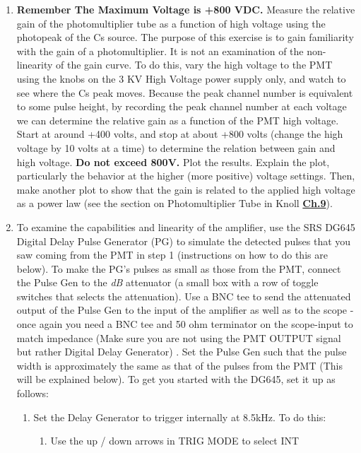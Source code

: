 \documentclass{../lab}
\begin{document}
\begin{enumerate}
    \item \textbf{Remember The Maximum Voltage is +800 VDC.} Measure the relative gain of the photomultiplier tube as a function of high voltage using the photopeak of the Cs source. The purpose of this exercise is to gain familiarity with the gain of a photomultiplier. It is not an examination of the non-linearity of the gain curve. To do this, vary the high voltage to the PMT using the knobs on the 3 KV High Voltage power supply only, and watch to see where the Cs peak moves. Because the peak channel number is equivalent to some pulse height, by recording the peak channel number at each voltage we can determine the relative gain as a function of the PMT high voltage. Start at around +400 volts, and stop at about +800 volts (change the high voltage by 10 volts at a time) to determine the relation between gain and high voltage. \textbf{Do not exceed 800V.} Plot the results. Explain the plot, particularly the behavior at the higher (more positive) voltage settings. Then, make another plot to show that the gain is related to the applied high voltage as a power law (see the section on Photomultiplier Tube in Knoll \href{http://physics111.lib.berkeley.edu/Physics111/Reprints/GMA/01-Radiation\_Detection\_and\_Measurement\_CH\_09.pdf}{\textbf{Ch.9}}).

    \item To examine the capabilities and linearity of the amplifier, use the SRS DG645 Digital Delay Pulse Generator (PG) to simulate the detected pulses that you saw coming from the PMT in step 1 (instructions on how to do this are below). To make the PG's pulses as small as those from the PMT, connect the Pulse Gen to the \emph{dB} attenuator (a small box with a row of toggle switches that selects the attenuation). Use a BNC tee to send the attenuated output of the Pulse Gen to the input of the amplifier as well as to the scope - once again you need a BNC tee and 50 ohm terminator on the scope-input to match impedance (Make sure you are not using the PMT OUTPUT signal but rather Digital Delay Generator) . Set the Pulse Gen such that the pulse width is approximately the same as that of the pulses from the PMT (This will be explained below). To get you started with the DG645, set it up as follows:
    \begin{enumerate}
        \item Set the Delay Generator to trigger internally at 8.5kHz. To do this:
        \begin{enumerate}
            \item Use the up / down arrows in TRIG MODE to select INT


\end{enumerate}
\end{enumerate}
\end{enumerate}
\end{document}
